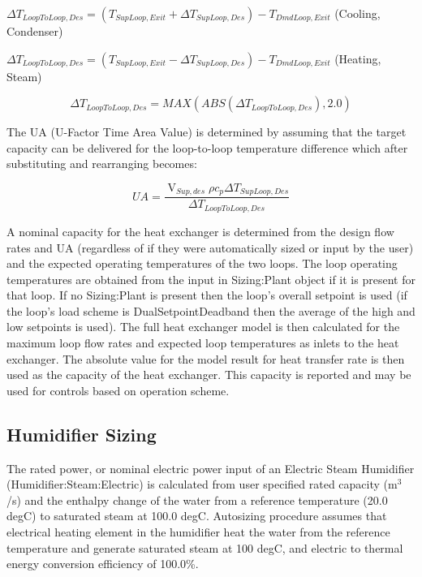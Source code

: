 \(\Delta {T_{LoopToLoop,Des}} = \left( {{T_{SupLoop,Exit}} + \Delta {T_{SupLoop,Des}}} \right) - {T_{DmdLoop,Exit}}\) (Cooling, Condenser)

\(\Delta {T_{LoopToLoop,Des}} = \left( {{T_{SupLoop,Exit}} - \Delta {T_{SupLoop,Des}}} \right) - {T_{DmdLoop,Exit}}\) (Heating, Steam)

\begin{equation}
\Delta {T_{LoopToLoop,Des}} = MAX\left( {ABS\left( {\Delta {T_{LoopToLoop,Des}}} \right),2.0} \right)
\end{equation}

The UA (U-Factor Time Area Value) is determined by assuming that the target capacity can be delivered for the loop-to-loop temperature difference which after substituting and rearranging becomes:

\begin{equation}
UA = \frac{{{{\mathop {V}\limits }_{Sup,des}}\rho {c_p}\Delta {T_{SupLoop,Des}}}}{{\Delta {T_{LoopToLoop,Des}}}}
\end{equation}

A nominal capacity for the heat exchanger is determined from the design flow rates and UA (regardless of if they were automatically sized or input by the user) and the expected operating temperatures of the two loops. The loop operating temperatures are obtained from the input in Sizing:Plant object if it is present for that loop. If no Sizing:Plant is present then the loop's overall setpoint is used (if the loop's load scheme is DualSetpointDeadband then the average of the high and low setpoints is used). The full heat exchanger model is then calculated for the maximum loop flow rates and expected loop temperatures as inlets to the heat exchanger. The absolute value for the model result for heat transfer rate is then used as the capacity of the heat exchanger. This capacity is reported and may be used for controls based on operation scheme.

\subsection{Humidifier Sizing}\label{humidifier-sizing}

The rated power, or nominal electric power input of an Electric Steam Humidifier (Humidifier:Steam:Electric) is calculated from user specified rated capacity (m\(^{3}\)/s) and the enthalpy change of the water from a reference temperature (20.0 degC) to saturated steam at 100.0 degC. Autosizing procedure assumes that electrical heating element in the humidifier heat the water from the reference temperature and generate saturated steam at 100 degC, and electric to thermal energy conversion efficiency of 100.0\%.

